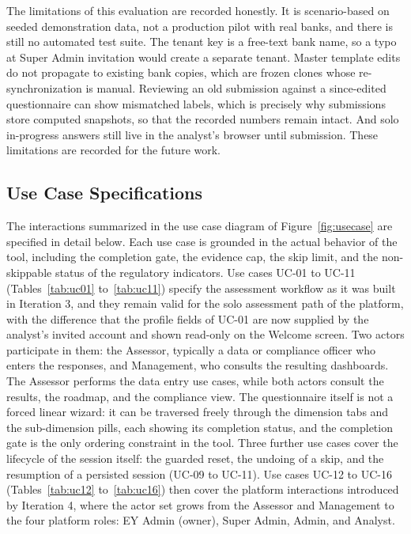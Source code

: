 The limitations of this evaluation are recorded honestly. It is scenario-based on seeded demonstration data, not a production pilot with real banks, and there is still no automated test suite. The tenant key is a free-text bank name, so a typo at Super Admin invitation would create a separate tenant. Master template edits do not propagate to existing bank copies, which are frozen clones whose re-synchronization is manual. Reviewing an old submission against a since-edited questionnaire can show mismatched labels, which is precisely why submissions store computed snapshots, so that the recorded numbers remain intact. And solo in-progress answers still live in the analyst's browser until submission. These limitations are recorded for the future work.

\subsection{Use Case Specifications}

The interactions summarized in the use case diagram of Figure~\ref{fig:usecase} are specified in detail below. Each use case is grounded in the actual behavior of the tool, including the completion gate, the evidence cap, the skip limit, and the non-skippable status of the regulatory indicators. Use cases UC-01 to UC-11 (Tables~\ref{tab:uc01} to~\ref{tab:uc11}) specify the assessment workflow as it was built in Iteration 3, and they remain valid for the solo assessment path of the platform, with the difference that the profile fields of UC-01 are now supplied by the analyst's invited account and shown read-only on the Welcome screen. Two actors participate in them: the Assessor, typically a data or compliance officer who enters the responses, and Management, who consults the resulting dashboards. The Assessor performs the data entry use cases, while both actors consult the results, the roadmap, and the compliance view. The questionnaire itself is not a forced linear wizard: it can be traversed freely through the dimension tabs and the sub-dimension pills, each showing its completion status, and the completion gate is the only ordering constraint in the tool. Three further use cases cover the lifecycle of the session itself: the guarded reset, the undoing of a skip, and the resumption of a persisted session (UC-09 to UC-11). Use cases UC-12 to UC-16 (Tables~\ref{tab:uc12} to~\ref{tab:uc16}) then cover the platform interactions introduced by Iteration 4, where the actor set grows from the Assessor and Management to the four platform roles: EY Admin (owner), Super Admin, Admin, and Analyst.

